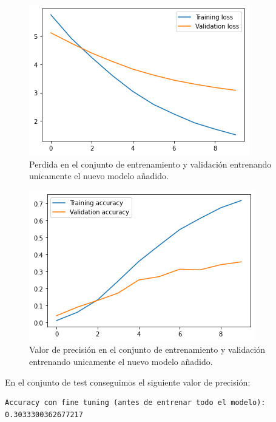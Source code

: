 \documentclass[12pt, spanish]{article}
\begin{document}
\begin{figure}[H]
  \centering
      \includegraphics[width=\textwidth]{3-2-antes-1.png}
 		\caption{Perdida en el conjunto de entrenamiento y validación entrenando unicamente el nuevo modelo añadido.}
\end{figure}

\begin{figure}[H]
  \centering
      \includegraphics[width=\textwidth]{3-2-antes-2.png}
 		\caption{Valor de precisión en el conjunto de entrenamiento y validación entrenando unicamente el nuevo modelo añadido.}
\end{figure}



En el conjunto de test conseguimos el siguiente valor de precisión:

\begin{lstlisting}
Accuracy con fine tuning (antes de entrenar todo el modelo): 0.3033300362677217
\end{lstlisting}
\end{document}
